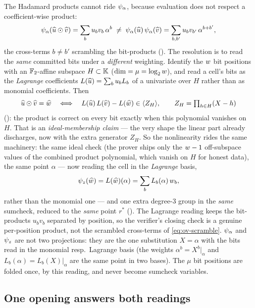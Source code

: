 The Hadamard products cannot ride $\psi_{\alpha}$, because evaluation does not respect a
coefficient-wise product:
\begin{equation}
  \label{eq:ov-scramble}
  \psi_{\alpha}(\widehat{u}\odot\widehat{v}) = \sum_b u_b v_b\,\alpha^{b}
  \;\neq\;
  \psi_{\alpha}(\widehat{u})\,\psi_{\alpha}(\widehat{v}) = \sum_{b,b'} u_b v_{b'}\,\alpha^{b+b'},
\end{equation}
the cross-terms $b\neq b'$ scrambling the bit-products
(). The resolution is to read the \emph{same}
committed bits under a \emph{different} weighting. Identify the $w$ bit
positions with an $\mathbb{F}_2$-affine subspace $H\subset\mathbb{K}$ ($\dim = \mu = \log_2w$),
and read a cell's bits as the \emph{Lagrange} coefficients
$L(\widehat{u}) = \sum_b u_b L_b$ of a univariate over $H$ rather than as monomial
coefficients. Then
\begin{equation}
  \label{eq:ov-had-ideal}
  \widehat{u}\odot\widehat{v}=\widehat{w}
  \quad\Longleftrightarrow\quad
  L(\widehat{u})\,L(\widehat{v}) - L(\widehat{w}) \in \langle Z_H \rangle,
  \qquad Z_H = \textstyle\prod_{h\in H}(X-h)
\end{equation}
(): the product is correct on every bit exactly when this
polynomial vanishes on $H$. That is an \emph{ideal-membership claim} --- the
very shape the linear part already discharges, now with the extra generator
$Z_H$. So the nonlinearity rides the same machinery: the same ideal check (the
prover ships only the $w-1$ off-subspace values of the combined product
polynomial, which vanish on $H$ for honest data), the same point $\alpha$ ---
now reading the cell in the \emph{Lagrange} basis,
\[
  \psi_{z}(\widehat{w}) = L(\widehat{w})(\alpha) = \sum_b L_b(\alpha)\,w_b,
\]
rather than the monomial one --- and one extra degree-$3$ group in the
\emph{same} sumcheck, reduced to the \emph{same} point $r^*$
(). The Lagrange reading keeps the bit-products $u_b v_b$
separated by position, so the verifier's closing check is a genuine
per-position product, not the scrambled cross-terms of \eqref{eq:ov-scramble}.
$\psi_{\alpha}$ and $\psi_{z}$ are not two projections: they are the one substitution
$X = \alpha$ with the bits read in the monomial resp.\ Lagrange basis (the
weights $\alpha^b = X^b|_\alpha$ and $L_b(\alpha) = L_b(X)|_\alpha$ are the same
point in two bases). The $\mu$ bit positions are folded once, by this reading,
and never become sumcheck variables.

\subsection{One opening answers both readings}
\label{sec:overview-open}

